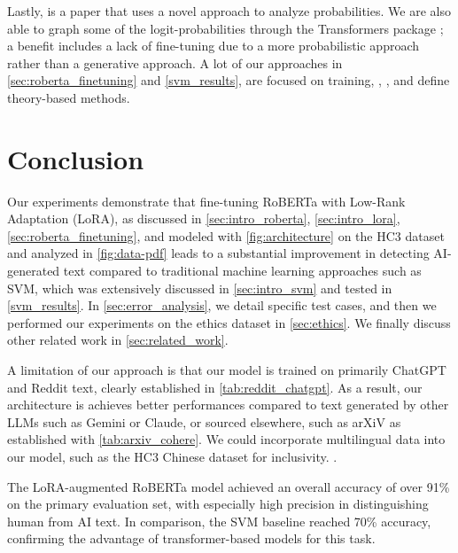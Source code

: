 \documentclass[11pt]{article}
\begin{document}
Lastly, \cite{mitchell2023detectgptzeroshotmachinegeneratedtext} is a paper that uses a novel approach to analyze probabilities. We are also able to graph some of the logit-probabilities through the Transformers package \cite{wolf-etal-2020-transformers}; a benefit includes a lack of fine-tuning due to a more probabilistic approach rather than a generative approach. A lot of our approaches in \autoref{sec:roberta_finetuning} and \autoref{svm_results}, are focused on training, \cite{gururangan-etal-2020-dont}, \cite{jiao-etal-2021-self}, and \cite{mitchell2023detectgptzeroshotmachinegeneratedtext}  define theory-based methods.


\section{Conclusion}

Our experiments demonstrate that fine-tuning RoBERTa with Low-Rank Adaptation (LoRA), as discussed in \autoref{sec:intro_roberta}, \autoref{sec:intro_lora}, \autoref{sec:roberta_finetuning}, and modeled with \autoref{fig:architecture} on the HC3 dataset \cite{guo2023hc3} and analyzed in \autoref{fig:data-pdf} leads to a substantial improvement in detecting AI-generated text compared to traditional machine learning approaches such as SVM, which was extensively discussed in \autoref{sec:intro_svm} and tested in \autoref{svm_results}. In \autoref{sec:error_analysis}, we detail specific test cases, and then we performed our experiments on the ethics dataset in \autoref{sec:ethics}. We finally discuss other related work in \autoref{sec:related_work}.



A limitation of our approach is that our model is trained on primarily ChatGPT and Reddit text, clearly established in \autoref{tab:reddit_chatgpt}. As a result, our architecture is achieves better performances compared to text generated by other LLMs such as Gemini or Claude, or sourced elsewhere, such as arXiV as established with \autoref{tab:arxiv_cohere}. We could incorporate multilingual data into our model, such as the HC3 Chinese dataset for inclusivity. \cite{guo-etal-2023-hc3}. 


The LoRA-augmented RoBERTa model achieved an overall accuracy of over 91\% on the primary evaluation set, with especially high precision in distinguishing human from AI text. In comparison, the SVM baseline reached 70\% accuracy, confirming the advantage of transformer-based models for this task.
\end{document}
